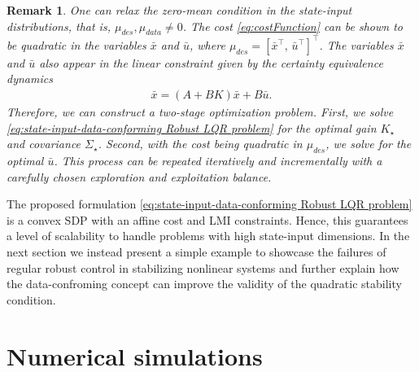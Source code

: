 \documentclass[letterpaper, 10 pt, conference]{ieeeconf}
\newtheorem{remark}{Remark}
\begin{document}
\begin{remark} 
One can relax the zero-mean condition in the state-input distributions, that is, $\mu_{des},\mu_{data} \neq 0$. The cost \eqref{eq:costFunction} can be shown to be quadratic in the variables $\bar x$ and $\bar u$, where $\mu_{des} = \left [\bar x^\top,\, \bar u^\top \right ]^\top$. The variables $\bar x$ and $\bar u$ also appear in the linear constraint given by the certainty equivalence dynamics
\begin{align*}
    \bar x = (A + B K) \bar x + B \bar u.
\end{align*}
Therefore, we can construct a two-stage optimization problem. First, we solve \eqref{eq:state-input-data-conforming Robust LQR problem} for the optimal gain $K_\star$ and covariance $\Sigma_\star$. Second, with the cost being quadratic in $\mu_{des}$, we solve for the optimal $\bar u$. This process can be repeated iteratively and incrementally with a carefully chosen exploration and exploitation balance.
\end{remark}

The proposed formulation \eqref{eq:state-input-data-conforming Robust LQR problem} is a convex SDP with an affine cost and LMI constraints. Hence, this guarantees a level of scalability to handle problems with high state-input dimensions. In the next section we instead present a simple example to showcase the failures of regular robust control in stabilizing nonlinear systems and further explain how the data-confroming concept can improve the validity of the quadratic stability condition.

\section{Numerical simulations} \label{section: Numerical}
 \label{section: Numerical}
\end{document}
